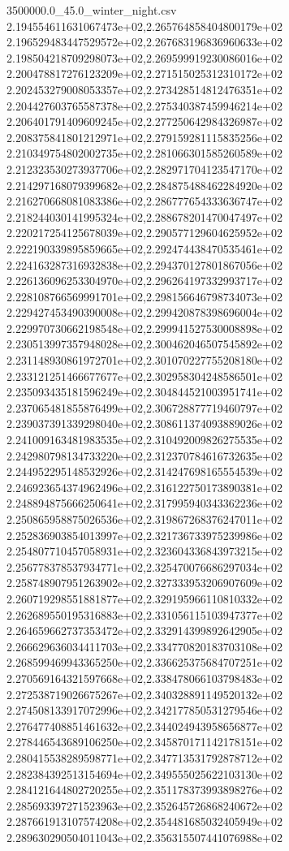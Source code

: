 \begin{filecontents*}{3500000.0_45.0_winter_night.csv}
2.194554611631067473e+02,2.265764858404800179e+02
2.196529483447529572e+02,2.267683196836960633e+02
2.198504218709298073e+02,2.269599919230086016e+02
2.200478817276123209e+02,2.271515025312310172e+02
2.202453279008053357e+02,2.273428514812476351e+02
2.204427603765587378e+02,2.275340387459946214e+02
2.206401791409609245e+02,2.277250642984326987e+02
2.208375841801212971e+02,2.279159281115835256e+02
2.210349754802002735e+02,2.281066301585260589e+02
2.212323530273937706e+02,2.282971704123547170e+02
2.214297168079399682e+02,2.284875488462284920e+02
2.216270668081083386e+02,2.286777654333636747e+02
2.218244030141995324e+02,2.288678201470047497e+02
2.220217254125678039e+02,2.290577129604625952e+02
2.222190339895859665e+02,2.292474438470535461e+02
2.224163287316932838e+02,2.294370127801867056e+02
2.226136096253304970e+02,2.296264197332993717e+02
2.228108766569991701e+02,2.298156646798734073e+02
2.229427453490390008e+02,2.299420878398696004e+02
2.229970730662198548e+02,2.299941527530008898e+02
2.230513997357948028e+02,2.300462046507545892e+02
2.231148930861972701e+02,2.301070227755208180e+02
2.233121251466677677e+02,2.302958304248586501e+02
2.235093435181596249e+02,2.304844521003951741e+02
2.237065481855876499e+02,2.306728877719460797e+02
2.239037391339298040e+02,2.308611374093889026e+02
2.241009163481983535e+02,2.310492009826275535e+02
2.242980798134733220e+02,2.312370784616732635e+02
2.244952295148532926e+02,2.314247698165554539e+02
2.246923654374962496e+02,2.316122750173890381e+02
2.248894875666250641e+02,2.317995940343362236e+02
2.250865958875026536e+02,2.319867268376247011e+02
2.252836903854013997e+02,2.321736733975239986e+02
2.254807710457058931e+02,2.323604336843973215e+02
2.256778378537934771e+02,2.325470076686297034e+02
2.258748907951263902e+02,2.327333953206907609e+02
2.260719298551881877e+02,2.329195966110810332e+02
2.262689550195316883e+02,2.331056115103947377e+02
2.264659662737353472e+02,2.332914399892642905e+02
2.266629636034411703e+02,2.334770820183703108e+02
2.268599469943365250e+02,2.336625375684707251e+02
2.270569164321597668e+02,2.338478066103798483e+02
2.272538719026675267e+02,2.340328891149520132e+02
2.274508133917072996e+02,2.342177850531279546e+02
2.276477408851461632e+02,2.344024943958656877e+02
2.278446543689106250e+02,2.345870171142178151e+02
2.280415538289598771e+02,2.347713531792878712e+02
2.282384392513154694e+02,2.349555025622103130e+02
2.284121644802720255e+02,2.351178373993898276e+02
2.285693397271523963e+02,2.352645726868240672e+02
2.287661913107574208e+02,2.354481685032405949e+02
2.289630290504011043e+02,2.356315507441076988e+02

\end{filecontents*}
